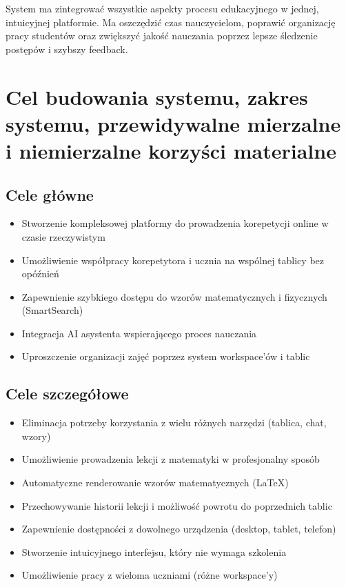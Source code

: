 \documentclass[12pt,a4paper]{article}
\begin{document}
System ma zintegrować wszystkie aspekty procesu edukacyjnego w jednej, intuicyjnej platformie. Ma oszczędzić czas nauczycielom, poprawić organizację pracy studentów oraz zwiększyć jakość nauczania poprzez lepsze śledzenie postępów i szybszy feedback.

\section{Cel budowania systemu, zakres systemu, przewidywalne mierzalne i niemierzalne korzyści materialne}

\subsection{Cele główne}

\begin{itemize}[leftmargin=*]
    \item Stworzenie kompleksowej platformy do prowadzenia korepetycji online w czasie rzeczywistym
    \item Umożliwienie współpracy korepetytora i ucznia na wspólnej tablicy bez opóźnień
    \item Zapewnienie szybkiego dostępu do wzorów matematycznych i fizycznych (SmartSearch)
    \item Integracja AI asystenta wspierającego proces nauczania
    \item Uproszczenie organizacji zajęć poprzez system workspace'ów i tablic
\end{itemize}

\subsection{Cele szczegółowe}

\begin{itemize}[leftmargin=*]
    \item Eliminacja potrzeby korzystania z wielu różnych narzędzi (tablica, chat, wzory)
    \item Umożliwienie prowadzenia lekcji z matematyki w profesjonalny sposób
    \item Automatyczne renderowanie wzorów matematycznych (LaTeX)
    \item Przechowywanie historii lekcji i możliwość powrotu do poprzednich tablic
    \item Zapewnienie dostępności z dowolnego urządzenia (desktop, tablet, telefon)
    \item Stworzenie intuicyjnego interfejsu, który nie wymaga szkolenia
    \item Umożliwienie pracy z wieloma uczniami (różne workspace'y)
\end{itemize}
\end{document}
